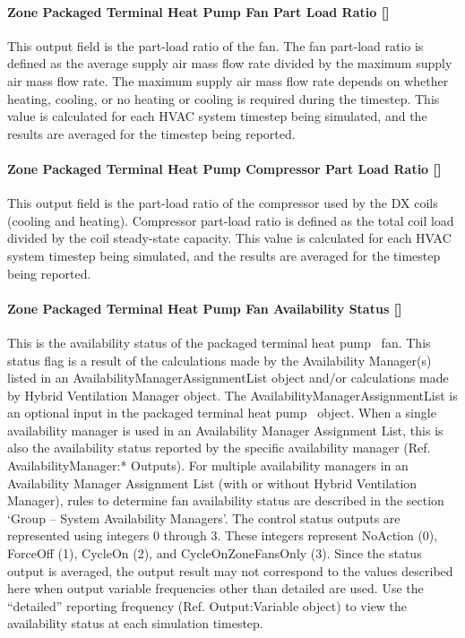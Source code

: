 \paragraph{Zone Packaged Terminal Heat Pump Fan Part Load Ratio {[]}}\label{zone-packaged-terminal-heat-pump-fan-part-load-ratio}

This output field is the part-load ratio of the fan. The fan part-load ratio is defined as the average supply air mass flow rate divided by the maximum supply air mass flow rate. The maximum supply air mass flow rate depends on whether heating, cooling, or no heating or cooling is required during the timestep. This value is calculated for each HVAC system timestep being simulated, and the results are averaged for the timestep being reported.

\paragraph{Zone Packaged Terminal Heat Pump Compressor Part Load Ratio {[]}}\label{zone-packaged-terminal-heat-pump-compressor-part-load-ratio}

This output field is the part-load ratio of the compressor used by the DX coils (cooling and heating). Compressor part-load ratio is defined as the total coil load divided by the coil steady-state capacity. This value is calculated for each HVAC system timestep being simulated, and the results are averaged for the timestep being reported.

\paragraph{Zone Packaged Terminal Heat Pump Fan Availability Status {[]}}\label{zone-packaged-terminal-heat-pump-fan-availability-status}

This is the availability status of the packaged terminal heat pump~ fan. This status flag is a result of the calculations made by the Availability Manager(s) listed in an AvailabilityManagerAssignmentList object and/or calculations made by Hybrid Ventilation Manager object. The AvailabilityManagerAssignmentList is an optional input in the packaged terminal heat pump~ object. When a single availability manager is used in an Availability Manager Assignment List, this is also the availability status reported by the specific availability manager (Ref. AvailabilityManager:* Outputs). For multiple availability managers in an Availability Manager Assignment List (with or without Hybrid Ventilation Manager), rules to determine fan availability status are described in the section `Group -- System Availability Managers'. The control status outputs are represented using integers 0 through 3. These integers represent NoAction (0), ForceOff (1), CycleOn (2), and CycleOnZoneFansOnly (3). Since the status output is averaged, the output result may not correspond to the values described here when output variable frequencies other than detailed are used. Use the ``detailed'' reporting frequency (Ref. Output:Variable object) to view the availability status at each simulation timestep.

